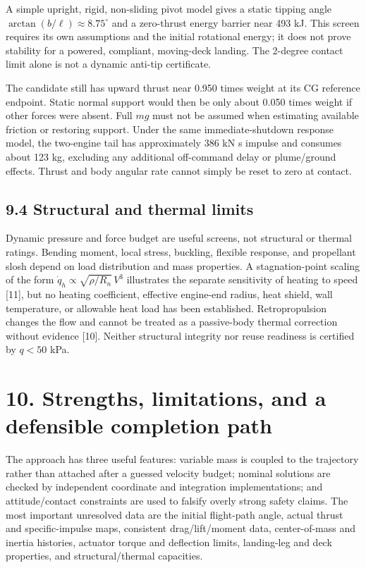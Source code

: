 \documentclass[
  11pt,
  a4paper,
]{article}
\begin{document}
A simple upright, rigid, non-sliding pivot model gives a static tipping
angle \(\arctan(b/\ell)\approx8.75^\circ\) and a zero-thrust energy
barrier near 493 kJ. This screen requires its own assumptions and the
initial rotational energy; it does not prove stability for a powered,
compliant, moving-deck landing. The 2-degree contact limit alone is not
a dynamic anti-tip certificate.

The candidate still has upward thrust near 0.950 times weight at its CG
reference endpoint. Static normal support would then be only about 0.050
times weight if other forces were absent. Full \(mg\) must not be
assumed when estimating available friction or restoring support. Under
the same immediate-shutdown response model, the two-engine tail has
approximately 386 kN s impulse and consumes about 123 kg, excluding any
additional off-command delay or plume/ground effects. Thrust and body
angular rate cannot simply be reset to zero at contact.

\subsection{9.4 Structural and thermal
limits}\label{structural-and-thermal-limits}

Dynamic pressure and force budget are useful screens, not structural or
thermal ratings. Bending moment, local stress, buckling, flexible
response, and propellant slosh depend on load distribution and mass
properties. A stagnation-point scaling of the form
\(\dot q_h\propto\sqrt{\rho/R_n}\,V^3\) illustrates the separate
sensitivity of heating to speed {[}11{]}, but no heating coefficient,
effective engine-end radius, heat shield, wall temperature, or allowable
heat load has been established. Retropropulsion changes the flow and
cannot be treated as a passive-body thermal correction without evidence
{[}10{]}. Neither structural integrity nor reuse readiness is certified
by \(q<50\) kPa.

\section{10. Strengths, limitations, and a defensible completion
path}\label{strengths-limitations-and-a-defensible-completion-path}

The approach has three useful features: variable mass is coupled to the
trajectory rather than attached after a guessed velocity budget; nominal
solutions are checked by independent coordinate and integration
implementations; and attitude/contact constraints are used to falsify
overly strong safety claims. The most important unresolved data are the
initial flight-path angle, actual thrust and specific-impulse maps,
consistent drag/lift/moment data, center-of-mass and inertia histories,
actuator torque and deflection limits, landing-leg and deck properties,
and structural/thermal capacities.
\end{document}
